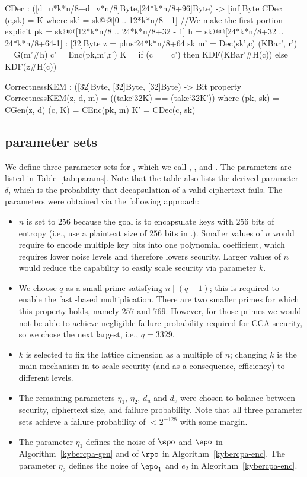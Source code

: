 \begin{code}
  CDec : ([d_u*k*n/8+d_v*n/8]Byte,[24*k*n/8+96]Byte) -> [inf]Byte
  CDec (c,sk) = K
    where
      sk' = sk@@[0 .. 12*k*n/8 - 1] //We make the first portion explicit
      pk = sk@@[12*k*n/8 .. 24*k*n/8+32 - 1]
      h = sk@@[24*k*n/8+32 .. 24*k*n/8+64-1] : [32]Byte
      z = plus`{24*k*n/8+64} sk
      m' = Dec(sk',c)
      (KBar', r') = G(m'#h)
      c' = Enc(pk,m',r')
      K = if (c == c') then KDF(KBar'#H(c))
                       else KDF(z#H(c))


  CorrectnessKEM : ([32]Byte, [32]Byte, [32]Byte) -> Bit
  property CorrectnessKEM(z, d, m) = ((take`{32}K) == (take`{32}K')) where
    (pk, sk) = CGen(z, d)
    (c, K) = CEnc(pk, m)
    K' = CDec(c, sk)
\end{code}

\subsection{\Kyber parameter sets}
\label{subsec:specification:params}

We define three parameter sets for \Kyber, which we call \KyberLow, \KyberMid, and \KyberHigh.
The parameters are listed in Table~\ref{tab:params}. Note that the table also lists the
derived parameter $\delta$, which is the probability that decapsulation of a valid
\KyberCCAKEM ciphertext fails. The parameters were obtained via the following approach:
\begin{itemize}
  \item $n$ is set to $256$ because the goal is to encapsulate keys with $256$ bits of entropy 
    (i.e., use a plaintext size of $256$ bits in \KyberCPAPKE.\PKEEnc).
    Smaller values of $n$ would require to encode multiple key bits into one polynomial
    coefficient, which requires lower noise levels and therefore lowers security.
    Larger values of $n$ would reduce the capability to easily scale security via
    parameter $k$.
  \item We choose $q$ as a small prime satisfying $n \mid (q-1)$; 
    this is required to enable the fast \NTT-based multiplication.
    There are two smaller primes for which this property holds, namely
    $257$ and $769$. However, for those primes we would not be able
    to achieve negligible failure probability required for CCA security, 
    so we chose the next largest, i.e., $q=3329$.
  \item $k$ is selected to fix the lattice dimension as a multiple of $n$;
    changing $k$ is the main mechanism in \Kyber to scale security (and as a consequence,
    efficiency) to different levels.
  \item The remaining parameters $\eta_1$, $\eta_2$, $d_u$ and $d_v$ were chosen to balance
    between security, ciphertext size,
    and failure probability. Note that all three parameter sets achieve a failure probability of $<2^{-128}$
    with some margin.
  \item The parameter $\eta_1$ defines the noise of $\spo$ and $\epo$ in Algorithm~\ref{kybercpa-gen} and of $\rpo$ in Algorithm~\ref{kybercpa-enc}.  The parameter $\eta_2$ defines the noise of $\epo_1$ and $e_2$ in Algorithm~\ref{kybercpa-enc}. 
\end{itemize}

